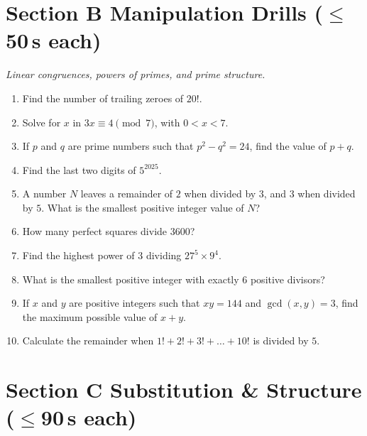 \documentclass[11pt,a4paper]{article}
\begin{document}
\section*{Section B \quad Manipulation Drills \hfill{\normalfont\small($\leq$50\,s each)}}

\noindent\textit{Linear congruences, powers of primes, and prime structure.}

\begin{enumerate}

\item Find the number of trailing zeroes of $20!$.

\item Solve for $x$ in $3x \equiv 4 \pmod 7$, with $0 < x < 7$.

\item If $p$ and $q$ are prime numbers such that $p^2 - q^2 = 24$, find the value of $p+q$.

\item Find the last two digits of $5^{2025}$.

\item A number $N$ leaves a remainder of $2$ when divided by $3$, and $3$ when divided by $5$. What is the smallest positive integer value of $N$?

\item How many perfect squares divide $3600$?

\item Find the highest power of $3$ dividing $27^5 \times 9^4$.

\item What is the smallest positive integer with exactly $6$ positive divisors?

\item If $x$ and $y$ are positive integers such that $xy = 144$ and $\gcd(x,y)=3$, find the maximum possible value of $x+y$.

\item Calculate the remainder when $1! + 2! + 3! + \dots + 10!$ is divided by $5$.

\end{enumerate}

\section*{Section C \quad Substitution \& Structure \hfill{\normalfont\small($\leq$90\,s each)}}
\end{document}
